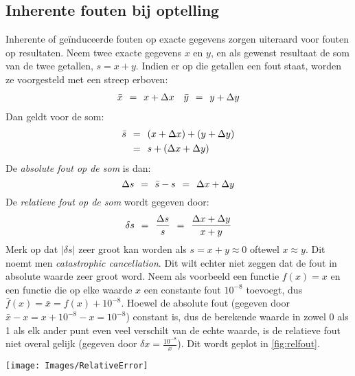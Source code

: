 \documentclass[11pt]{report}
\def \eq {\hspace{1.5mm}=\hspace{1.5mm}}
\begin{document}
		\subsection*{Inherente fouten bij optelling}
		Inherente of ge\"{i}nduceerde fouten op exacte gegevens zorgen uiteraard voor fouten op resultaten. Neem twee exacte gegevens $x$ en $y$, en als gewenst resultaat de som van de twee getallen, $s = x + y$. Indien er op die getallen een fout staat, worden ze voorgesteld met een streep erboven:
		\begin{align*}
			\bar x \eq x + \Delta x && \bar y \eq y + \Delta y
		\end{align*}
		Dan geldt voor de som:
		\begin{align*}
			\bar s  &\eq (x + \Delta x) + (y + \Delta y)\\
			   & \eq s + (\Delta x + \Delta y)
		\end{align*}
		De \textit{absolute fout op de som} is dan:
		\begin{equation}
			\Delta s \eq \bar s - s \eq \Delta x + \Delta y
		\end{equation}
		De \textit{relatieve fout op de som} wordt gegeven door:
		\begin{equation}
			\delta s \eq \frac{\Delta s}{s} \eq \frac{\Delta x + \Delta y}{x + y}
		\end{equation}
		Merk op dat $|\delta s|$ zeer groot kan worden als $s = x + y \approx 0$ oftewel $x \approx y$. Dit noemt men \textit{catastrophic cancellation}. Dit wilt echter niet zeggen dat de fout in absolute waarde zeer groot word. Neem als voorbeeld een functie $f(x) = x$ en een functie die op elke waarde $x$ een constante fout $10^{-8}$ toevoegt, dus $\bar f(x) = \bar x = f(x) + 10^{-8}$. Hoewel de absolute fout (gegeven door $\bar x - x = x + 10^{-8} - x = 10^{-8}$) constant is, dus de berekende waarde in zowel 0 als 1 als elk ander punt even veel verschilt van de echte waarde, is de relatieve fout niet overal gelijk (gegeven door $\delta x = \frac{10^{-8}}{x}$). Dit wordt geplot in \ref{fig:relfout}.
		\begin{figure*}[h]
			\centering
			\texttt{[image: Images/RelativeError]}
			\caption{De relatieve fout gegeven door $\delta x = 10^{-8} / x$}
			\label{fig:relfout}
		\end{figure*}
		
\end{document}
